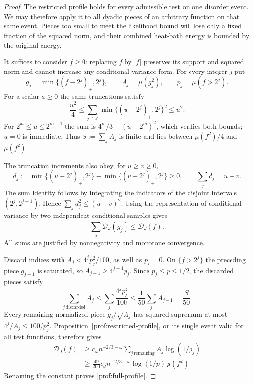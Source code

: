 \begin{proof}
The restricted profile holds for every admissible test on one disorder
event. We may therefore apply it to all dyadic pieces of an arbitrary
function on that same event. Pieces too small to meet the likelihood
bound will lose only a fixed fraction of the squared norm, and their
combined heat-bath energy is bounded by the original energy.

It suffices to consider $f\ge0$: replacing $f$ by $|f|$ preserves its
support and squared norm and cannot increase any conditional-variance
form.  For every integer $j$ put
\[
 g_j=\min\{(f-2^j)_+,2^j\},\qquad
 A_j=\mu(g_j^2),\qquad p_j=\mu(f>2^j).
\]
For a scalar $u\ge0$ the same truncations satisfy
\begin{equation}
 \frac{u^2}{4}\le
       \sum_{j\in\mathbb Z}\min\{(u-2^j)_+,2^j\}^2
       \le u^2.
 \label{prof:dyadic-norms}
\end{equation}
For $2^m\le u\le2^{m+1}$ the sum is
$4^m/3+(u-2^m)^2$, which verifies both bounds; $u=0$ is immediate.
Thus $S:=\sum_jA_j$ is finite and lies between $\mu(f^2)/4$ and
$\mu(f^2)$.

The truncation increments also obey, for $u\ge v\ge0$,
\[
 d_j:=\min\{(u-2^j)_+,2^j\}
      -\min\{(v-2^j)_+,2^j\}\ge0,
 \qquad \sum_jd_j=u-v.
\]
The sum identity follows by integrating the indicators of the disjoint
intervals $(2^j,2^{j+1})$.  Hence $\sum_jd_j^2\le(u-v)^2$.
Using the representation of conditional variance by two independent
conditional samples gives
\begin{equation}
 \sum_j\mathcal D_J(g_j)\le\mathcal D_J(f).
 \label{prof:dyadic-energies}
\end{equation}
All sums are justified by nonnegativity and monotone convergence.

Discard indices with $A_j<4^jp_j^2/100$, as well as $p_j=0$.
On $\{f>2^j\}$ the preceding piece $g_{j-1}$ is saturated, so
$A_{j-1}\ge4^{j-1}p_j$.  Since $p_j\le p\le1/2$, the discarded pieces
satisfy
\[
 \sum_{j\,\mathrm{discarded}}A_j
 \le\sum_j\frac{4^jp_j^2}{100}
 \le\frac1{50}\sum_jA_{j-1}=\frac S{50}.
\]
Every remaining normalized piece $g_j/\sqrt{A_j}$ has squared supremum at
most $4^j/A_j\le100/p_j^2$.  Proposition~\ref{prof:restricted-profile},
on its single event valid for all test functions, therefore gives
\[
 \begin{split}
 \mathcal D_J(f)
 &\ge c_\omega n^{-2/3-\omega}
       \sum_{j\,\mathrm{remaining}}A_j\log(1/p_j)\\
 &\ge\frac{49}{200}c_\omega n^{-2/3-\omega}
                 \log(1/p)\,\mu(f^2).
 \end{split}
\]
Renaming the constant proves \eqref{prof:full-profile}.


\end{proof}
